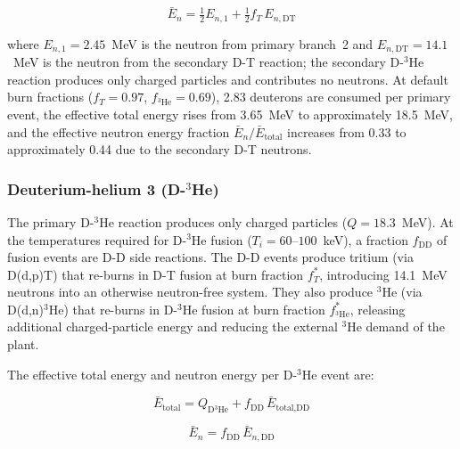 \documentclass{article}
\begin{document}
\begin{equation}
\label{eq:dd-eneutron}
\bar{E}_n = \tfrac{1}{2} E_{n,1} + \tfrac{1}{2} f_T \, E_{n,\text{DT}}
\end{equation}

\noindent where $E_{n,1} = 2.45$~MeV is the neutron from primary branch~2
and $E_{n,\text{DT}} = 14.1$~MeV is the neutron from the secondary D-T
reaction; the secondary D-${}^3$He reaction produces only charged
particles and contributes no neutrons.
At default burn fractions ($f_T = 0.97$,
$f_{{}^3\text{He}} = 0.69$), 2.83 deuterons are consumed per primary
event, the effective total energy rises from
3.65~MeV to approximately 18.5~MeV, and the effective
neutron energy fraction $\bar{E}_n / \bar{E}_{\text{total}}$ increases from
0.33 to approximately 0.44 due to the secondary D-T neutrons.

\subsubsection{\texorpdfstring{Deuterium-helium 3 (D-${}^3$He)}{Deuterium-helium 3 (D-3He)}}
The primary D-${}^3$He reaction produces only charged particles
($Q = 18.3$~MeV). At the temperatures required for D-${}^3$He fusion
($T_i = 60$--$100$~keV), a fraction $f_{\text{DD}}$ of fusion events
are D-D side reactions. The D-D events produce tritium (via
D(d,p)T) that re-burns in D-T fusion at burn fraction
$f_T^*$, introducing 14.1~MeV neutrons into an
otherwise neutron-free system. They also produce ${}^3$He
(via D(d,n)${}^3$He) that re-burns in D-${}^3$He fusion at burn
fraction $f_{{}^3\text{He}}^*$, releasing additional
charged-particle energy and reducing the external ${}^3$He demand
of the plant.

The effective total energy and neutron energy per D-${}^3$He event are:

\begin{equation}
\label{eq:dhe3-etotal}
\bar{E}_{\text{total}} = Q_{\text{D}{}^3\text{He}}
  + f_{\text{DD}} \, \bar{E}_{\text{total,DD}}
\end{equation}

\begin{equation}
\label{eq:dhe3-eneutron}
\bar{E}_n = f_{\text{DD}} \, \bar{E}_{n,\text{DD}}
\end{equation}
\end{document}
